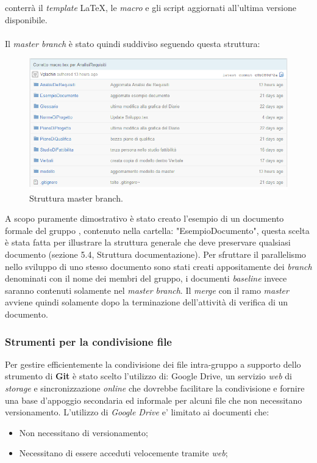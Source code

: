 conterrà il \textit{template} \LaTeX, le \textit{macro} e gli script aggiornati all'ultima versione disponibile.
\\
\\
Il \textit{master branch} è stato quindi suddiviso seguendo questa struttura:
\begin{figure}
\centering
\includegraphics[width= %
\linewidth]{immaginiNDP/repository}
\caption[]{Struttura master branch.}
\label{fig:repository}
\end{figure}
A scopo puramente dimostrativo è stato creato l'esempio di un documento formale del gruppo \gruppo, contenuto nella cartella: "EsempioDocumento", questa scelta è stata fatta per illustrare la struttura generale che deve preservare qualsiasi documento (sezione 5.4, Struttura documentazione).
Per sfruttare il parallelismo nello sviluppo di uno stesso documento sono stati creati appositamente dei  \textit{branch} denominati con il nome dei membri del gruppo, i documenti  \textit{baseline} invece saranno contenuti solamente nel \textit{master branch}. Il \textit{merge} con il ramo \textit{master} avviene quindi solamente dopo la terminazione dell'attività di verifica di un documento.

\subsubsection{Strumenti per la condivisione file}
Per gestire efficientemente la condivisione dei file intra-gruppo a supporto dello strumento di \textbf{Git} è stato scelto l'utilizzo di: Google Drive, un servizio \textit{web} di \textit{storage} e sincronizzazione \textit{online} che dovrebbe facilitare la condivisione e fornire una base d'appoggio secondaria ed informale per alcuni file che non necessitano versionamento.
L'utilizzo di \textit{Google Drive} e' limitato ai documenti che:
\begin{itemize}
\item Non necessitano di versionamento;
\item Necessitano di essere acceduti velocemente tramite \textit{web};
\end{itemize}


